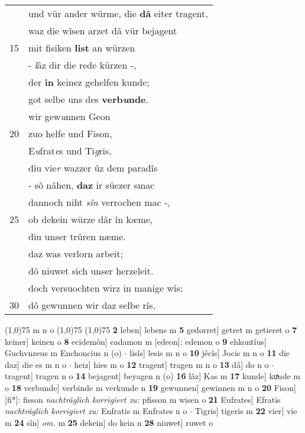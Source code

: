 \documentclass[8pt,a4paper,notitlepage]{article}
\begin{document}
\begin{table}[ht]
\begin{minipage}[t]{0.5\linewidth}
\begin{tabular}{rl}
 & und vür ander würme, die \textbf{dâ} eiter tragent,\\ 
 & waz die wîsen arzet dâ vür bejagent\\ 
15 & mit fisiken \textbf{list} an würzen\\ 
 & - \textit{l}âz dir die rede kürzen -,\\ 
 & der \textbf{in} keinez gehelfen kunde;\\ 
 & got selbe uns des \textbf{verb\textit{u}nde}.\\ 
 & wir gew\textit{u}nnen Geon\\ 
20 & zuo helfe und Fison,\\ 
 & E\textit{u}frat\textit{e}s und Ti\textit{g}ris,\\ 
 & diu vie\textit{r} wazzer ûz dem paradîs\\ 
 & - sô nâhen, \textbf{daz} ir süezer smac\\ 
 & dannoch niht \textit{sîn} verrochen mac -,\\ 
25 & ob dekein würze dâr în kæme,\\ 
 & diu unser trûren næme.\\ 
 & daz was verlorn arbeit;\\ 
 & dô niuwet sich unser herzeleit.\\ 
 & doch versuochten wirz in manige wîs;\\ 
30 & dô gewunnen wir daz selbe rîs,\\ 
\end{tabular}
\scriptsize
\line(1,0){75} \newline
m n o \newline
\line(1,0){75} \newline
\newline
\line(1,0){75} \newline
\textbf{2} leben] lebens m \textbf{5} gedorret] getret m getieret o \textbf{7} keiner] keinen o \textbf{8} ecidemôn] eadamon m [edeon]: edemon o \textbf{9} ehkontîus] Guchvnzeus m Enchoncius n (o)  $\cdot$ lisîs] lesis m n o \textbf{10} jêcîs] Jocis m n o \textbf{11} die daz] die es m n o  $\cdot$ heiz] hies m o \textbf{12} tragent] tragen m n o \textbf{13} dâ] do n o  $\cdot$ tragent] tragen n o \textbf{14} bejagent] beyagen n (o) \textbf{16} lâz] Kas m \textbf{17} kunde] kuͯnde m o \textbf{18} verbunde] verbinde m verkunde n \textbf{19} gewunnen] gewinnen m n o \textbf{20} Fison] [fi*]: fisson \textit{nachträglich korrigiert zu:} pfisson m wisen o \textbf{21} Eufrates] Efratis \textit{nachträglich korrigiert zu:} Enfratis m Enfrates n o  $\cdot$ Tigris] tigeris m \textbf{22} vier] vie m \textbf{24} sîn] \textit{om.} m \textbf{25} dekein] do kein n \textbf{28} niuwet] ruwet o \newline
\end{minipage}
\end{table}
\end{document}
